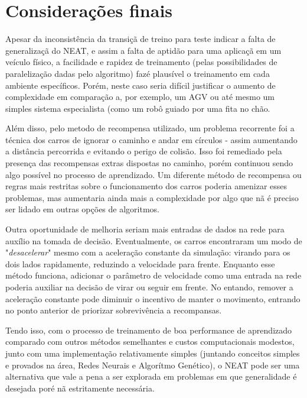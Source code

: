 \chapter{Considerações finais}

Apesar da inconsist{\^e}ncia da transi{\c
c}{\~a} de treino para teste indicar a falta de
generaliza{\c c}{\~a} do NEAT, e assim a falta
de aptid{\~a}o para uma aplica{\c c}{\~a} em um
ve{\'i}culo f{\'i}sico, a facilidade e rapidez
de treinamento (pelas possibilidades de
paraleliza{\c c}{\~a}o dadas pelo algoritmo)
faz{\'e} plaus{\'i}vel o treinamento em cada
ambiente espec{\'i}ficos. Por{\'e}m, neste caso
seria dif{\'i}cil justificar o aumento de
complexidade em compara{\c c}{\~a}o a, por
exemplo, um AGV ou at{\'e} mesmo um simples
sistema especialista (como um rob{\^o} guiado
por uma fita no ch{\~a}o.

Al{\'e}m disso, pelo metodo de recompensa utilizado, um problema recorrente foi a t{\'e}cnica dos carros de ignorar o caminho e andar em c{\'i}rculos - assim aumentando a dist{\^a}ncia percorrida e evitando o perigo de colis{\~a}o. Isso foi remediado pela presen{\c c}a das recompensas extras dispostas no caminho, por{\'e}m continuou sendo algo poss{\'i}vel no processo de aprendizado. Um diferente m{\'e}todo de recompensa ou regras mais restritas sobre o funcionamento dos carros poderia amenizar esses problemas, mas aumentaria ainda mais a complexidade por algo que n{\~a} {\'e} preciso ser lidado em outras op{\c c}{\~o}es de algoritmos.

Outra oportunidade de melhoria seriam mais entradas de dados na rede para aux{\'i}lio na tomada de decis{\~a}o. Eventualmente, os carros encontraram um modo de "\textit{desacelerar}" mesmo com a acelera{\c c}{\~a}o constante da simula{\c c}{\~a}o: virando para os dois lados rapidamente, reduzindo a velocidade para frente. Enquanto esse m{\'e}todo funciona, adicionar o par{\^a}metro de velocidade como uma entrada na rede poderia auxiliar na decis{\~a}o de virar ou seguir em frente. No entando, remover a acelera{\c c}{\~a}o constante pode diminuir o incentivo de manter o movimento, entrando no ponto anterior de priorizar sobreviv{\^e}ncia a recompansas.

Tendo isso, com o processo de treinamento de boa
performance de aprendizado comparado com outros
m{\'e}todos semelhantes e custos computacionais
modestos, junto com uma implementa{\c c}{\~a}o
relativamente simples (juntando conceitos
simples e provados na {\'a}rea, Redes Neurais e
Algor{\'i}tmo Gen{\'e}tico), o NEAT pode ser uma
alternativa que vale a pena a ser explorada em
problemas em que generalidade {\'e} desejada
por{\'e} n{\~a} estritamente necess{\'a}ria.
